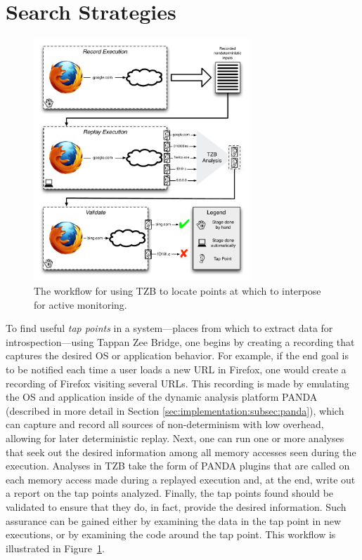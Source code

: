 \section{Search Strategies}
\label{sec:technical}

\begin{figure}
    \begin{center}
        \includegraphics[width=3.2in]{figures/tzbarch.pdf}
    \end{center}
    \caption{The workflow for using TZB to locate points at which to
    interpose for active monitoring.}
    \label{fig:workflow}
\end{figure}

To find useful \emph{tap points} in a system---places from which to
extract data for introspection---using Tappan Zee Bridge, one begins by
creating a recording that captures the desired OS or application
behavior. For example, if the end goal is to be notified each time a
user loads a new URL in Firefox, one would create a recording of Firefox
visiting several URLs. This recording is made by emulating the OS and
application inside of the dynamic analysis platform PANDA (described in
more detail in Section \ref{sec:implementation:subsec:panda}), which can
capture and record all sources of non-determinism with low overhead,
allowing for later deterministic replay. Next, one can run one or more
analyses that seek out the desired information among all memory accesses
seen during the execution.  Analyses in TZB take the form of PANDA
plugins that are called on each memory access made during a replayed
execution and, at the end, write out a report on the tap points
analyzed. Finally, the tap points found should be validated to ensure
that they do, in fact, provide the desired information. Such assurance
can be gained either by examining the data in the tap point in new
executions, or by examining the code around the tap point. This workflow
is illustrated in Figure~\ref{fig:workflow}.

